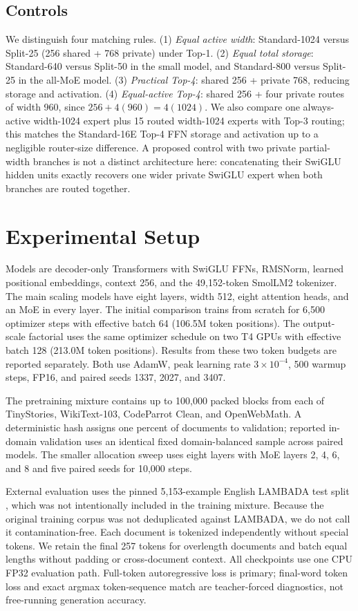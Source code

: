 \documentclass[10pt]{article}
\begin{document}
\subsection{Controls}
We distinguish four matching rules. (1) \emph{Equal active width}: Standard-1024 versus Split-25 (256 shared + 768 private) under Top-1. (2) \emph{Equal total storage}: Standard-640 versus Split-50 in the small model, and Standard-800 versus Split-25 in the all-MoE model. (3) \emph{Practical Top-4}: shared 256 + private 768, reducing storage and activation. (4) \emph{Equal-active Top-4}: shared 256 + four private routes of width 960, since $256+4(960)=4(1024)$. We also compare one always-active width-1024 expert plus 15 routed width-1024 experts with Top-3 routing; this matches the Standard-16E Top-4 FFN storage and activation up to a negligible router-size difference. A proposed control with two private partial-width branches is not a distinct architecture here: concatenating their SwiGLU hidden units exactly recovers one wider private SwiGLU expert when both branches are routed together.

\section{Experimental Setup}
Models are decoder-only Transformers with SwiGLU FFNs, RMSNorm, learned positional embeddings, context 256, and the 49,152-token SmolLM2 tokenizer. The main scaling models have eight layers, width 512, eight attention heads, and an MoE in every layer. The initial comparison trains from scratch for 6,500 optimizer steps with effective batch 64 (106.5M token positions). The output-scale factorial uses the same optimizer schedule on two T4 GPUs with effective batch 128 (213.0M token positions). Results from these two token budgets are reported separately. Both use AdamW, peak learning rate $3\times10^{-4}$, 500 warmup steps, FP16, and paired seeds 1337, 2027, and 3407.

The pretraining mixture contains up to 100,000 packed blocks from each of TinyStories, WikiText-103, CodeParrot Clean, and OpenWebMath. A deterministic hash assigns one percent of documents to validation; reported in-domain validation uses an identical fixed domain-balanced sample across paired models. The smaller allocation sweep uses eight layers with MoE layers 2, 4, 6, and 8 and five paired seeds for 10,000 steps.

External evaluation uses the pinned 5,153-example English LAMBADA test split \citep{paperno2016lambada}, which was not intentionally included in the training mixture. Because the original training corpus was not deduplicated against LAMBADA, we do not call it contamination-free. Each document is tokenized independently without special tokens. We retain the final 257 tokens for overlength documents and batch equal lengths without padding or cross-document context. All checkpoints use one CPU FP32 evaluation path. Full-token autoregressive loss is primary; final-word token loss and exact argmax token-sequence match are teacher-forced diagnostics, not free-running generation accuracy.
\end{document}
